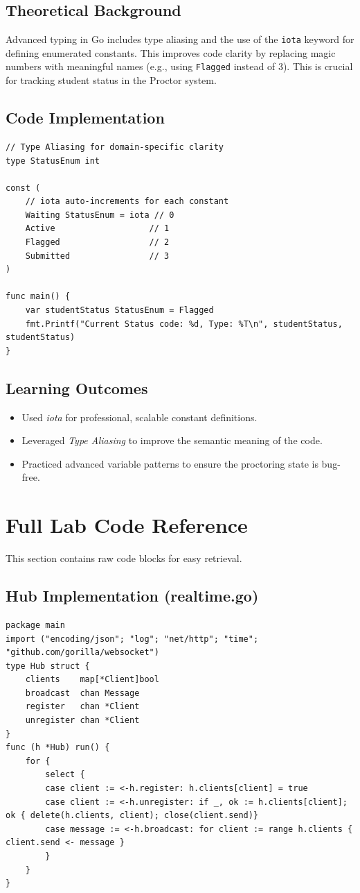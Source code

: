 \documentclass[12pt,a4paper]{article}
\begin{document}
\subsection{Theoretical Background}
Advanced typing in Go includes type aliasing and the use of the \texttt{iota} keyword for defining enumerated constants. This improves code clarity by replacing magic numbers with meaningful names (e.g., using \texttt{Flagged} instead of 3). This is crucial for tracking student status in the Proctor system.

\subsection{Code Implementation}
\begin{lstlisting}
// Type Aliasing for domain-specific clarity
type StatusEnum int

const (
    // iota auto-increments for each constant
    Waiting StatusEnum = iota // 0
    Active                   // 1
    Flagged                  // 2
    Submitted                // 3
)

func main() {
    var studentStatus StatusEnum = Flagged
    fmt.Printf("Current Status code: %d, Type: %T\n", studentStatus, studentStatus)
}
\end{lstlisting}

\subsection{Learning Outcomes}
\begin{itemize}
    \item Used \textit{iota} for professional, scalable constant definitions.
    \item Leveraged \textit{Type Aliasing} to improve the semantic meaning of the code.
    \item Practiced advanced variable patterns to ensure the proctoring state is bug-free.
\end{itemize}

\newpage
\section{Full Lab Code Reference}
This section contains raw code blocks for easy retrieval.

\subsection{Hub Implementation (realtime.go)}
\begin{lstlisting}[basicstyle=\ttfamily\scriptsize]
package main
import ("encoding/json"; "log"; "net/http"; "time"; "github.com/gorilla/websocket")
type Hub struct {
	clients    map[*Client]bool
	broadcast  chan Message
	register   chan *Client
	unregister chan *Client
}
func (h *Hub) run() {
	for {
		select {
		case client := <-h.register: h.clients[client] = true
		case client := <-h.unregister: if _, ok := h.clients[client]; ok { delete(h.clients, client); close(client.send)}
		case message := <-h.broadcast: for client := range h.clients { client.send <- message }
		}
	}
}
\end{lstlisting}
\end{document}
